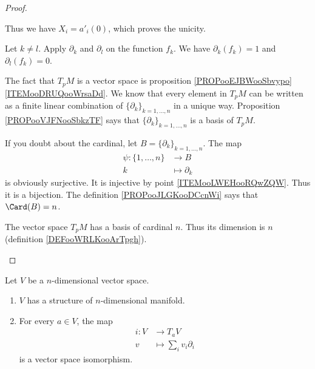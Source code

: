 \begin{proof}
\begin{subproof}
		Thus we have \( X_i=a'_i(0)\), which proves the unicity.

		Let \( k\neq l\). Apply \( \partial_k\) and \( \partial_l\) on the function \( f_k\). We have \( \partial_k(f_k)=1\) and \( \partial_l(f_k)=0\).

		The fact that \( T_pM\) is a vector space is proposition \ref{PROPooEJBWooSbvypo}\ref{ITEMooDRUQooWrsaDd}. We know that every element in \( T_pM\) can be written as a finite linear combination of \( \{ \partial_k \}_{k=1,\ldots,n}\) in a unique way. Proposition \ref{PROPooVJFNooSbkzTF} says that \( \{ \partial_k \}_{k=1,\ldots,n}\) is a basis of \( T_pM\).


		If you doubt about the cardinal, let \( B=\{ \partial_k \}_{k=1,\ldots,n} \). The map
		\begin{equation}
			\begin{aligned}
				\psi\colon \{ 1,\ldots,n \} & \to B              \\
				k                           & \mapsto \partial_k
			\end{aligned}
		\end{equation}
		is obviously surjective. It is injective by point \ref{ITEMooLWEHooRQwZQW}. Thus it is a bijection. The definition \ref{PROPooJLGKooDCcnWi} says that \( \Card(B)=n\).

		The vector space \( T_pM\) has a basis of cardinal \( n\). Thus its dimension is \( n\) (definition \ref{DEFooWRLKooArTpgh}).
	\end{subproof}
\end{proof}


\begin{proposition}     \label{PROPooJVSQooGvNqIx}
	Let \( V\) be a \( n\)-dimensional vector space.
	\begin{enumerate}
		\item
		      \( V\) has a structure of \( n\)-dimensional manifold.
		\item
		      For every \( a\in V\), the map
		      \begin{equation}
			      \begin{aligned}
				      i\colon V & \to T_aV                    \\
				      v         & \mapsto \sum_iv_i\partial_i
			      \end{aligned}
		      \end{equation}
		      is a vector space isomorphism.
	\end{enumerate}
\end{proposition}


